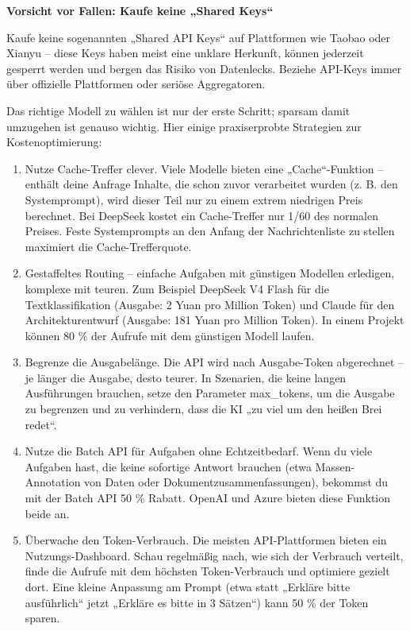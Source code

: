 \textbf{Vorsicht vor Fallen: Kaufe keine „Shared Keys“}\par

Kaufe keine sogenannten „Shared API Keys“ auf Plattformen wie Taobao oder Xianyu – diese Keys haben meist eine unklare Herkunft, können jederzeit gesperrt werden und bergen das Risiko von Datenlecks. Beziehe API-Keys immer über offizielle Plattformen oder seriöse Aggregatoren.


Das richtige Modell zu wählen ist nur der erste Schritt; sparsam damit umzugehen ist genauso wichtig. Hier einige praxiserprobte Strategien zur Kostenoptimierung:

\begin{enumerate}
  \item Nutze Cache-Treffer clever. Viele Modelle bieten eine „Cache“-Funktion – enthält deine Anfrage Inhalte, die schon zuvor verarbeitet wurden (z. B. den Systemprompt), wird dieser Teil nur zu einem extrem niedrigen Preis berechnet. Bei DeepSeek kostet ein Cache-Treffer nur 1/60 des normalen Preises. Feste Systemprompts an den Anfang der Nachrichtenliste zu stellen maximiert die Cache-Trefferquote.
  \item Gestaffeltes Routing – einfache Aufgaben mit günstigen Modellen erledigen, komplexe mit teuren. Zum Beispiel DeepSeek V4 Flash für die Textklassifikation (Ausgabe: 2 Yuan pro Million Token) und Claude für den Architekturentwurf (Ausgabe: 181 Yuan pro Million Token). In einem Projekt können 80 \% der Aufrufe mit dem günstigen Modell laufen.
  \item Begrenze die Ausgabelänge. Die API wird nach Ausgabe-Token abgerechnet – je länger die Ausgabe, desto teurer. In Szenarien, die keine langen Ausführungen brauchen, setze den Parameter max\_tokens, um die Ausgabe zu begrenzen und zu verhindern, dass die KI „zu viel um den heißen Brei redet“.
  \item Nutze die Batch API für Aufgaben ohne Echtzeitbedarf. Wenn du viele Aufgaben hast, die keine sofortige Antwort brauchen (etwa Massen-Annotation von Daten oder Dokumentzusammenfassungen), bekommst du mit der Batch API 50 \% Rabatt. OpenAI und Azure bieten diese Funktion beide an.
  \item Überwache den Token-Verbrauch. Die meisten API-Plattformen bieten ein Nutzungs-Dashboard. Schau regelmäßig nach, wie sich der Verbrauch verteilt, finde die Aufrufe mit dem höchsten Token-Verbrauch und optimiere gezielt dort. Eine kleine Anpassung am Prompt (etwa statt „Erkläre bitte ausführlich“ jetzt „Erkläre es bitte in 3 Sätzen“) kann 50 \% der Token sparen.
\end{enumerate}


